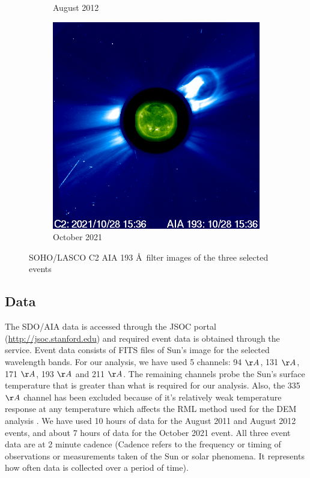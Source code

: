 \begin{figure}[h!]
\begin{subfigure}[b]{0.3\textwidth}
        \caption[August  2012 CME]{August  2012}
        \label{fig:soho_cme_aug_31_2012}
    \end{subfigure}
    \hfill
    \begin{subfigure}[b]{0.3\textwidth}
        \includegraphics[width=\textwidth]{images/soho_cme_oct_28_2021_aia193.png}
        \caption[October  2021]{October  2021}
        \label{fig:soho_cme_oct_28_2021}
    \end{subfigure}
    \caption[SOHO/LASCO C2 images with AIA 193 \AA filter]{SOHO/LASCO C2 AIA 193 \AA\ filter images of the three selected events}
    \label{fig:cme_events_soho_pics_aia193}
\end{figure}

\subsection{Data}
\label{sec:data_used}

The SDO/AIA data is accessed through the JSOC portal (\url{http://jsoc.stanford.edu}) and required event data is obtained through the service. Event data consists of FITS files of Sun's image for the selected wavelength bands. For our analysis, we have used 5 channels: 94 $\AA$, 131 $\AA$, 171 $\AA$, 193 $\AA$ and 211 $\AA$. The remaining channels probe the Sun's surface temperature that is greater than what is required for our analysis. Also, the 335 $\AA$ channel has been excluded because of it's relatively weak temperature response at any temperature which affects the RML method used for the DEM analysis \citep{Massa2023}. We have used 10 hours of data for the  August 2011 and  August 2012 events, and about 7 hours of data for the  October 2021 event. All three event data are at 2 minute cadence (Cadence refers to the frequency or timing of observations or measurements taken of the Sun or solar phenomena. It represents how often data is collected over a period of time).

